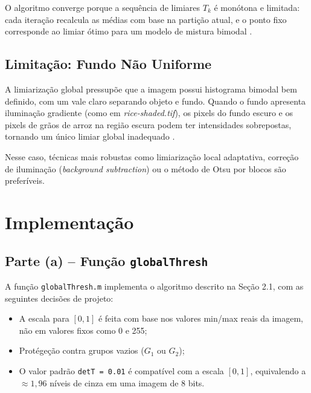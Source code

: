 \documentclass[12pt,a4paper,oneside,brazil,chapter=TITLE,section=TITLE]{abntex2}
\begin{document}
O algoritmo converge porque a sequ\^encia de limiares $T_k$ \'e
mon\'otona e limitada: cada itera\c{c}\~ao recalcula as m\'edias com
base na parti\c{c}\~ao atual, e o ponto fixo corresponde ao limiar
\'{o}timo para um modelo de mistura bimodal \cite{otsu1979}.

\section{Limita\c{c}\~ao: Fundo N\~ao Uniforme}

A limiariza\c{c}\~ao global pressup\~oe que a imagem possui histograma
bimodal bem definido, com um vale claro separando objeto e fundo.
Quando o fundo apresenta ilumina\c{c}\~ao gradiente (como em
\textit{rice-shaded.tif}), os pixels do fundo escuro e os pixels de
gr\~aos de arroz na regi\~ao escura podem ter intensidades sobrepostas,
tornando um \'unico limiar global inadequado \cite{gonzalez2018}.

Nesse caso, t\'ecnicas mais robustas como limiariza\c{c}\~ao local
adaptativa, corre\c{c}\~ao de ilumina\c{c}\~ao (\textit{background
subtraction}) ou o m\'etodo de Otsu por blocos s\~ao prefer\'iveis.

\chapter{Implementa\c{c}\~ao}

\section{Parte (a) -- Fun\c{c}\~ao \texttt{globalThresh}}

A fun\c{c}\~ao \texttt{globalThresh.m} implementa o algoritmo descrito
na Se\c{c}\~ao 2.1, com as seguintes decis\~oes de projeto:

\begin{itemize}
  \item A escala para $[0,1]$ \'e feita com base nos valores min/max
        reais da imagem, n\~ao em valores fixos como 0 e 255;
  \item Prot\'ege\c{c}\~ao contra grupos vazios ($G_1$ ou $G_2$);
  \item O valor padr\~ao \texttt{detT = 0.01} \'e compat\'ivel com a
        escala $[0,1]$, equivalendo a $\approx 1{,}96$ n\'iveis de cinza
        em uma imagem de 8 bits.
\end{itemize}
\end{document}
